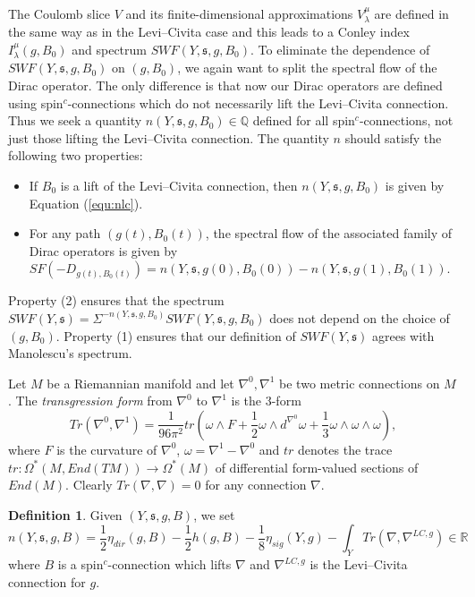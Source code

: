 \documentclass{amsart}
\theoremstyle{definition}
\newtheorem{definition}[theorem]{Definition}
\theoremstyle{remark}
\numberwithin{equation}{section}
\begin{document}
The Coulomb slice $V$ and its finite-dimensional approximations $V^\mu_\lambda$ are defined in the same way as in the Levi--Civita case and this leads to a Conley index $I^\mu_\lambda(g,B_0)$ and spectrum $SWF(Y , \mathfrak{s} , g , B_0)$. To eliminate the dependence of $SWF(Y , \mathfrak{s} , g , B_0)$ on $(g,B_0)$, we again want to split the spectral flow of the Dirac operator. The only difference is that now our Dirac operators are defined using spin$^c$-connections which do not necessarily lift the Levi--Civita connection. Thus we seek a quantity $n(Y , \mathfrak{s} , g , B_0) \in \mathbb{Q}$ defined for all spin$^c$-connections, not just those lifting the Levi--Civita connection. The quantity $n$ should satisfy the following two properties:
\begin{itemize}
\item[(1)]{If $B_0$ is a lift of the Levi--Civita connection, then $n(Y , \mathfrak{s} , g , B_0)$ is given by Equation (\ref{equ:nlc}).}
\item[(2)]{For any path $(g(t) , B_0(t))$, the spectral flow of the associated family of Dirac operators is given by $SF(-D_{g(t),B_0(t)}) = n(Y , \mathfrak{s} , g(0) , B_0(0)) - n(Y , \mathfrak{s} , g(1) , B_0(1))$.}
\end{itemize}

Property (2) ensures that the spectrum $SWF(Y , \mathfrak{s}) = \Sigma^{-n(Y ,\mathfrak{s} , g , B_0)} SWF(Y , \mathfrak{s} , g , B_0)$ does not depend on the choice of $(g,B_0)$. Property (1) ensures that our definition of $SWF(Y , \mathfrak{s})$ agrees with Manolescu's spectrum.

Let $M$ be a Riemannian manifold and let $\nabla^0,\nabla^1$ be two metric connections on $M$. The {\em transgression form} from $\nabla^0$ to $\nabla^1$ is the $3$-form
\[
Tr(\nabla^0 , \nabla^1) = \frac{1}{96\pi^2} tr\left( \omega \wedge F + \frac{1}{2} \omega \wedge d^{\nabla^0} \omega + \frac{1}{3} \omega \wedge \omega \wedge \omega \right),
\]
where $F$ is the curvature of $\nabla^0$, $\omega = \nabla^1 - \nabla^0$ and $tr$ denotes the trace $tr : \Omega^*( M , End(TM) ) \to \Omega^*(M)$ of differential form-valued sections of $End(M)$. Clearly $Tr(\nabla , \nabla) = 0$ for any connection $\nabla$.

\begin{definition}\label{def:n}
Given $(Y,\mathfrak{s} , g, B)$, we set
\[
n(Y,\mathfrak{s} , g ,B ) = \frac{1}{2}\eta_{dir}(g,B) - \frac{1}{2}h(g,B) - \frac{1}{8}\eta_{sig}(Y,g) - \int_Y Tr(\nabla , \nabla^{LC,g}) \in \mathbb{R}
\]
where $B$ is a spin$^c$-connection which lifts $\nabla$ and $\nabla^{LC,g}$ is the Levi--Civita connection for $g$.
\end{definition}
\end{document}
